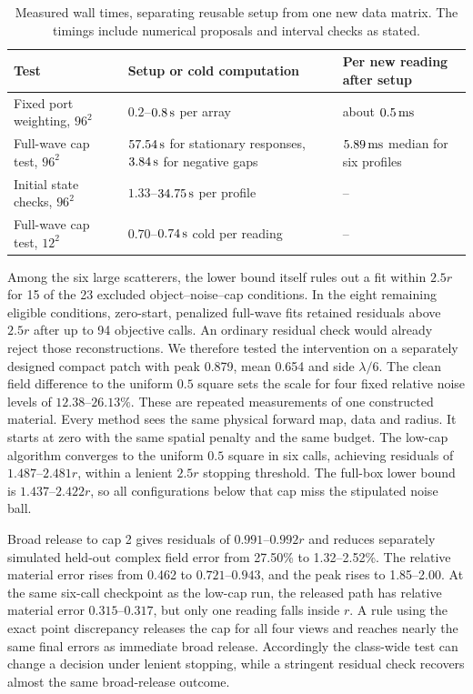 \begin{table}[tbp]
\centering\small
\caption{Measured wall times, separating reusable setup from one new data matrix. The timings include numerical proposals and interval checks as stated.}
\label{tab:cost}
\begin{tabular}{@{}>{\raggedright\arraybackslash}p{.28\linewidth}
                 >{\raggedright\arraybackslash}p{.39\linewidth}
                 >{\raggedright\arraybackslash}p{.23\linewidth}@{}}
\toprule
Test & Setup or cold computation & Per new reading after setup\\
\midrule
Fixed port weighting, \(96^2\) & \(0.2\)--\(0.8\,{\rm s}\) per array & about \(0.5\,{\rm ms}\)\\
Full-wave cap test, \(96^2\) & \(57.54\,{\rm s}\) for stationary responses, \(3.84\,{\rm s}\) for negative gaps & \(5.89\,{\rm ms}\) median for six profiles\\
Initial state checks, \(96^2\) & \(1.33\)--\(34.75\,{\rm s}\) per profile & --\\
Full-wave cap test, \(12^2\) & \(0.70\)--\(0.74\,{\rm s}\) cold per reading & --\\
\bottomrule
\end{tabular}
\end{table}

Among the six large scatterers, the lower bound itself rules out a fit within \(2.5r\) for 15 of the 23 excluded object--noise--cap conditions. In the eight remaining eligible conditions, zero-start, penalized full-wave fits retained residuals above \(2.5r\) after up to 94 objective calls. An ordinary residual check would already reject those reconstructions. We therefore tested the intervention on a separately designed compact patch with peak 0.879, mean 0.654 and side \(\lambda/6\). The clean field difference to the uniform \(0.5\) square sets the scale for four fixed relative noise levels of \(12.38\)--\(26.13\%\). These are repeated measurements of one constructed material. Every method sees the same physical forward map, data and radius. It starts at zero with the same spatial penalty and the same budget. The low-cap algorithm converges to the uniform \(0.5\) square in six calls, achieving residuals of \(1.487\)--\(2.481r\), within a lenient \(2.5r\) stopping threshold. The full-box lower bound is \(1.437\)--\(2.422r\), so all configurations below that cap miss the stipulated noise ball.

Broad release to cap 2 gives residuals of \(0.991\)--\(0.992r\) and reduces separately simulated held-out complex field error from 27.50\% to 1.32--2.52\%. The relative material error rises from 0.462 to \(0.721\)--\(0.943\), and the peak rises to 1.85--2.00. At the same six-call checkpoint as the low-cap run, the released path has relative material error \(0.315\)--\(0.317\), but only one reading falls inside \(r\). A rule using the exact point discrepancy releases the cap for all four views and reaches nearly the same final errors as immediate broad release. Accordingly the class-wide test can change a decision under lenient stopping, while a stringent residual check recovers almost the same broad-release outcome.

